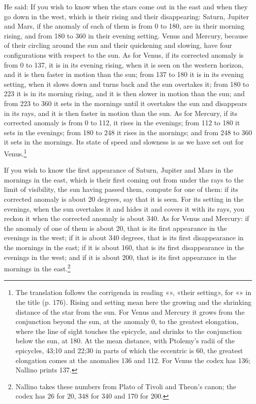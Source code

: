 \documentclass[11pt]{article}
\newcommand{\ArPage}[1]{\marginpar{\footnotesize\color{gray}Ar.\,p.\,#1}}
\begin{document}
\par \ArPage{177}He said: If you wish to know when the stars come out in the east and when they go down in the west, which is their rising and their disappearing: Saturn, Jupiter and Mars, if the anomaly of each of them is from 0 to 180, are in their morning rising, and from 180 to 360 in their evening setting. Venus and Mercury, because of their circling around the sun and their quickening and slowing, have four configurations with respect to the sun. As for Venus, if its corrected anomaly is from 0 to 137, it is in its evening rising, when it is seen on the western horizon, and it is then faster in motion than the sun; from 137 to 180 it is in its evening setting, when it slows down and turns back and the sun overtakes it; from 180 to 223 it is in its morning rising, and it is then slower in motion than the sun; and from 223 to 360 it sets in the mornings until it overtakes the sun and disappears in its rays, and it is then faster in motion than the sun. As for Mercury, if its corrected anomaly is from 0 to 112, it rises in the evenings; from 112 to 180 it sets in the evenings; from 180 to 248 it rises in the mornings; and from 248 to 360 it sets in the mornings. Its state of speed and slowness is as we have set out for Venus.\footnote{The translation follows the corrigenda in reading «», «their setting», for «» in the title (p. 176). Rising and setting mean here the growing and the shrinking distance of the star from the sun. For Venus and Mercury it grows from the conjunction beyond the sun, at the anomaly 0, to the greatest elongation, where the line of sight touches the epicycle, and shrinks to the conjunction below the sun, at 180. At the mean distance, with Ptolemy's radii of the epicycles, 43;10 and 22;30 in parts of which the eccentric is 60, the greatest elongation comes at the anomalies 136 and 112. For Venus the codex has 136; Nallino prints 137.}\par
\par If you wish to know the first appearance of Saturn, Jupiter and Mars in the mornings in the east, which is their first coming out from under the rays to the limit of visibility, the sun having passed them, compute for one of them: if its corrected anomaly is about 20 degrees, say that it is seen. For its setting in the evenings, when the sun overtakes it and hides it and covers it with its rays, you reckon it when the corrected anomaly is about 340. As for Venus and Mercury: if the anomaly of one of them is about 20, that is its first appearance in the evenings in the west; if it is about 340 degrees, that is its first disappearance in the mornings in the east; if it is about 160, that is its first disappearance in the evenings in the west; and if it is about 200, that is its first appearance in the mornings in the east.\footnote{Nallino takes these numbers from Plato of Tivoli and Theon's canon; the codex has 26 for 20, 348 for 340 and 170 for 200.}\par
\end{document}
